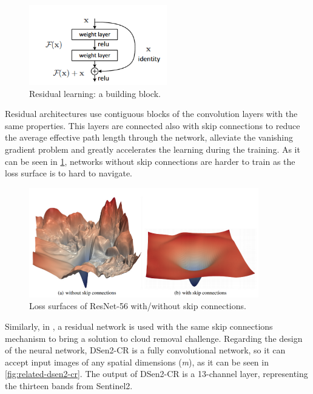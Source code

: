 \documentclass[11pt, a4paper]{article}
\begin{document}
	\begin{figure}[H]
		\centering
		\includegraphics[width=6cm]{imgs/relatedwork/residualblock.png}
		\caption{Residual learning: a building block.}
	\end{figure}
	Residual architectures use contiguous blocks of the convolution layers with the same properties. This layers are connected also with skip connections to reduce the average effective path length through the network, alleviate the vanishing gradient problem and greatly accelerates the learning during the training.  As it can be seen in \ref{fig:related-residual-loss}, networks without skip connections are harder to train as the loss surface is to hard to navigate. \cite{NEURIPS2018_a41b3bb3}
	\begin{figure}[H]
		\centering
		\includegraphics[width=10cm]{imgs/relatedwork/resloss.png}
		\caption{Loss surfaces of ResNet-56 with/without skip connections.}
		\label{fig:related-residual-loss}
	\end{figure}
	Similarly, in \cite{Meraner2020}, a residual network is used with the same skip connections mechanism to bring a solution to cloud removal challenge.
	Regarding the design of the neural network, DSen2-CR is a fully convolutional network, so it can accept input images of any spatial dimensions (\textit{m}), as it can be seen in \ref{fig:related-dsen2-cr}.
	The  output of DSen2-CR is a 13-channel layer, representing the thirteen bands from Sentinel2.  
\end{document}
